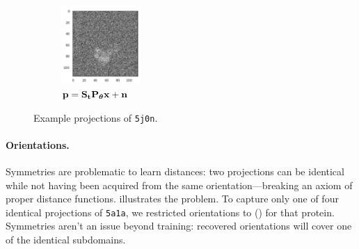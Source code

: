 \begin{figure}[ht!]
\begin{minipage}[b]{0.45\linewidth}
        \hfill
        \begin{subfigure}[b]{0.49\linewidth}
            \centering
            \includegraphics[height=3cm]{figures/5j0n_noise16_translated}
            \caption{$\mathbf{p} = \mathbf{S}_{\mathbf{t}} \mathbf{P}_{{\boldsymbol{\theta}}} \mathbf{x} + \mathbf{n}$}
        \end{subfigure}
        \caption{%
            Example projections of \texttt{5j0n}.
        }\label{fig:different-projections}
    \end{minipage}
\end{figure}

\paragraph{Orientations.}
Symmetries are problematic to learn distances: two projections can be identical while not having been acquired from the same orientation---breaking an axiom of proper distance functions.
 illustrates the problem.
To capture only one of four identical projections of \texttt{5a1a}, we restricted orientations to \todo{$(\theta_3,\theta_2,\theta_1) \in [0, 2\pi[ \, \times \, [0, \pi[ \, \times \, [0, \frac{\pi}{2}[$} () for that protein.
Symmetries aren't an issue beyond training: recovered orientations will cover one of the identical subdomains.

